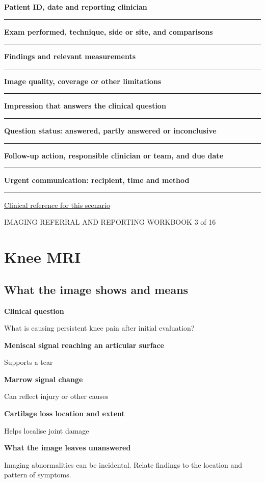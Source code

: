 \documentclass[11pt,a4paper]{article}
\newcommand{\record}[1]{\textbf{#1}\par\vspace{0.55\baselineskip}\hrule\vspace{0.35\baselineskip}}
\begin{document}
\record{Patient ID, date and reporting clinician}

\record{Exam performed, technique, side or site, and comparisons}

\record{Findings and relevant measurements}

\record{Image quality, coverage or other limitations}

\record{Impression that answers the clinical question}

\record{Question status: answered, partly answered or inconclusive}

\record{Follow-up action, responsible clinician or team, and due date}

\record{Urgent communication: recipient, time and method}

\small\href{https://acsearch.acr.org/docs/69432/Narrative}{Clinical reference for this scenario}

\normalsize

\newpage

{\small IMAGING REFERRAL AND REPORTING WORKBOOK \hfill 3 of 16}

\section*{Knee MRI}

\subsection*{What the image shows and means}

\textbf{Clinical question}\par What is causing persistent knee pain after initial evaluation?\par

\textbf{Meniscal signal reaching an articular surface}\par Supports a tear\par

\textbf{Marrow signal change}\par Can reflect injury or other causes\par

\textbf{Cartilage loss location and extent}\par Helps localise joint damage\par

\textbf{What the image leaves unanswered}\par Imaging abnormalities can be incidental. Relate findings to the location and pattern of symptoms.\par
\end{document}

